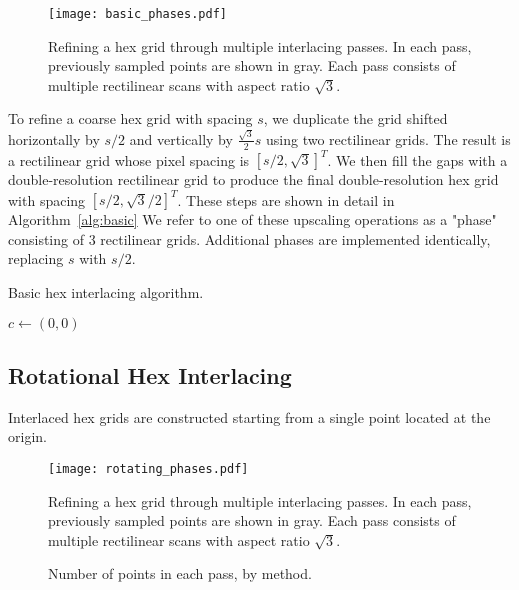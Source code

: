 \documentclass{article}
\begin{document}
\begin{figure}[ht]
\centering
\texttt{[image: basic\_phases.pdf]}
\caption{
\label{fig:basicphases} Refining a hex grid through multiple interlacing passes.
%
In each pass, previously sampled points are shown in gray.
%
Each pass consists of multiple rectilinear scans with aspect ratio $\sqrt{3}$.
}
\end{figure}

To refine a coarse hex grid with spacing $s$, we duplicate the grid shifted horizontally by $s/2$ and vertically by $\frac{\sqrt{3}}{2} s$ using two rectilinear grids.
%
The result is a rectilinear grid whose pixel spacing is $[s/2, \sqrt{3}]^T$.
%
We then fill the gaps with a double-resolution rectilinear grid to produce the final double-resolution hex grid with spacing $[s/2, \sqrt{3}/2]^T$.
%
These steps are shown in detail in Algorithm~\ref{alg:basic}
%
We refer to one of these upscaling operations as a "phase" consisting of 3 rectilinear grids.
%
Additional phases are implemented identically, replacing $s$ with $s/2$.

\begin{algorithm}
\caption{Basic hex interlacing algorithm.}\label{alg:basic}
\begin{algorithmic}
	\State $c \gets (0, 0)$
\end{algorithmic}
\end{algorithm}

\subsection{Rotational Hex Interlacing}
\label{triple-grid-interlacing}

Interlaced hex grids are constructed starting from a single point
located at the origin.

\begin{figure}[ht]
\centering
\texttt{[image: rotating\_phases.pdf]}
\caption{
\label{fig:rotatingphases} Refining a hex grid through multiple interlacing passes.
%
In each pass, previously sampled points are shown in gray.
%
Each pass consists of multiple rectilinear scans with aspect ratio $\sqrt{3}$.
}
\end{figure}

\begin{figure}[ht]
\caption{\label{fig:passsizes} Number of points in each pass, by method.}
\end{figure}
\end{document}
